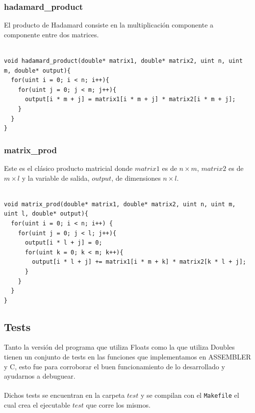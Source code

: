 \subsubsection{hadamard\_product}

El producto de Hadamard consiste en la multiplicación componente a componente entre dos matrices.
\\
\\
\begin{lstlisting}[frame=single]
void hadamard_product(double* matrix1, double* matrix2, uint n, uint m, double* output){
  for(uint i = 0; i < n; i++){
    for(uint j = 0; j < m; j++){
      output[i * m + j] = matrix1[i * m + j] * matrix2[i * m + j];
    }
  }
}
\end{lstlisting}

\subsubsection{matrix\_prod}

Este es el clásico producto matricial donde $matrix1$ es de $n \times m$, $matrix2$ es de $m \times l$ y la variable de salida, $output$, de dimensiones $n \times l$.
\\
\\
\begin{lstlisting}[frame=single,xleftmargin=1cm]
void matrix_prod(double* matrix1, double* matrix2, uint n, uint m, uint l, double* output){
  for(uint i = 0; i < n; i++) {
    for(uint j = 0; j < l; j++){
      output[i * l + j] = 0;
      for(uint k = 0; k < m; k++){
        output[i * l + j] += matrix1[i * m + k] * matrix2[k * l + j];
      }
    }
  }
}
\end{lstlisting}


\subsection{Tests}

Tanto la versión del programa que utiliza Floats como la que utiliza Doubles tienen un conjunto de tests en las funciones que implementamos en ASSEMBLER y C, esto fue para corroborar el buen funcionamiento de lo desarrollado y ayudarnos a debuguear.
\\
\\
Dichos tests se encuentran en la carpeta $test$ y se compilan con el \texttt{Makefile} el cual crea el ejecutable $test$ que corre los mismos.